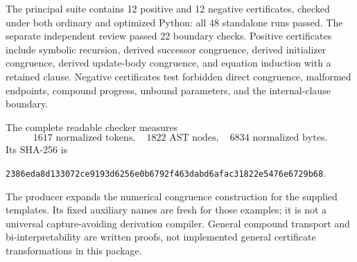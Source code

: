 The principal suite contains 12 positive and 12 negative certificates,
checked under both ordinary and optimized Python: all 48 standalone runs
passed. The separate independent review passed 22 boundary checks.
Positive certificates include symbolic recursion, derived successor
congruence, derived initializer congruence, derived update-body congruence,
and equation induction with a retained clause. Negative certificates test
forbidden direct congruence, malformed endpoints, compound progress,
unbound parameters, and the internal-clause boundary.

The complete readable checker measures
\[
 \boxed{1617\text{ normalized tokens},\quad1822\text{ AST nodes},\quad
        6834\text{ normalized bytes}.}
\]
Its SHA-256 is
\begin{center}\scriptsize\texttt{2386eda8d133072ce9193d6256e0b6792f463dabd6afac31822e5476e6729b68}.
\end{center}
The producer expands the numerical congruence construction for the
supplied templates. Its fixed auxiliary names are fresh for those
examples; it is not a universal capture-avoiding derivation compiler.
General compound transport and bi-interpretability are written proofs,
not implemented general certificate transformations in this package.
